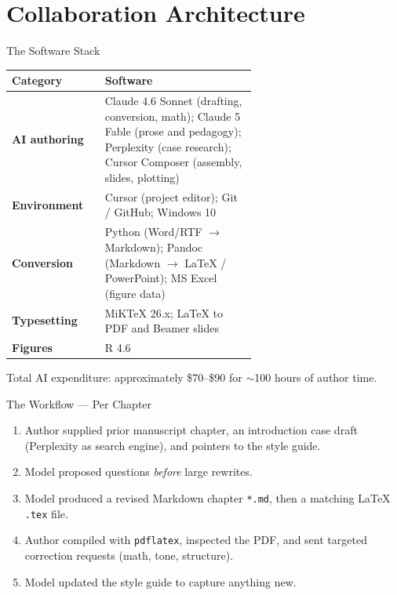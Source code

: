 \documentclass[aspectratio=169]{beamer}
\begin{document}
\section{Collaboration Architecture}

\begin{frame}{The Software Stack}

\small
\begin{tabular}{@{}lp{0.62\linewidth}@{}}
\toprule
\textbf{Category} & \textbf{Software} \\
\midrule
\textbf{AI authoring} &
  Claude 4.6 Sonnet (drafting, conversion, math); Claude 5 Fable
  (prose and pedagogy); Perplexity (case research);
  Cursor Composer (assembly, slides, plotting) \\[0.4em]
\textbf{Environment} &
  Cursor (project editor); Git / GitHub; Windows 10 \\[0.4em]
\textbf{Conversion} &
  Python (Word/RTF $\to$ Markdown);
  Pandoc (Markdown $\to$ \LaTeX{} / PowerPoint);
  MS Excel (figure data) \\[0.4em]
\textbf{Typesetting} &
  MiKTeX 26.x; \LaTeX{} to PDF and Beamer slides \\[0.4em]
\textbf{Figures} & R 4.6 \\
\bottomrule
\end{tabular}

\bigskip
\small
Total AI expenditure: approximately \$70--\$90 for $\sim$100 hours of
author time.

\end{frame}

\begin{frame}{The Workflow --- Per Chapter}

\begin{enumerate}\setlength\itemsep{0.7em}
  \item Author supplied prior manuscript chapter, an introduction case draft
        (Perplexity as search engine), and pointers to the style guide.
  \item Model proposed questions \emph{before} large rewrites.
  \item Model produced a revised Markdown chapter \texttt{*.md}, then a
        matching \LaTeX{} \texttt{.tex} file.
  \item Author compiled with \texttt{pdflatex}, inspected the PDF, and sent
        targeted correction requests (math, tone, structure).
  \item Model updated the style guide to capture anything new.
\end{enumerate}

\end{frame}
\end{document}
